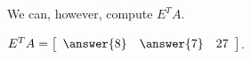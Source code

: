 \documentclass{ximera}
\begin{document}
\begin{problem}
\begin{enumerate}
\begin{problem}
            We can, however, compute $E^TA$.
    
            $E^TA=\startmat{rrr}
                \answer{8} & \answer{7} & 27
            \stopmat$.

        \end{problem}
      
        

    \end{enumerate}
    

\end{problem}
\end{document}
